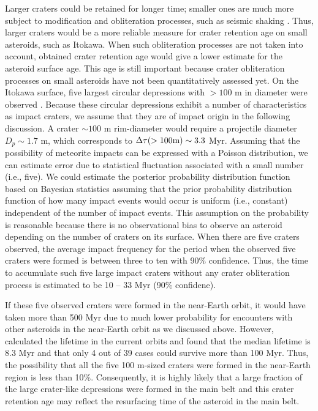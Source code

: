 \documentclass[3p,authoryear]{elsarticle}
\begin{document}
Larger craters could be retained for longer time; smaller ones are much more subject to modification and obliteration processes, such as seismic shaking \citep[i.e.,][]{michel2009}.
Thus, larger craters would be a more reliable measure for crater retention age on small asteroids, such as Itokawa.
When such obliteration processes are not taken into account, obtained crater retention age would give a lower estimate for the asteroid surface age.
This age is still important because crater obliteration processes on small asteroids have not been quantitatively assessed yet.
On the Itokawa surface, five largest circular depressions with $>100$ m in diameter were observed \citep{hirata2009}.
Because these circular depressions exhibit a number of characteristics as impact craters, we assume that they are of impact origin in the following discussion.
A crater $\sim 100$ m rim-diameter would require a projectile diameter $D_p\sim 1.7$ m, which corresponds to $\Delta \tau (>100 \rm{m})\sim 3.3$ Myr.
Assuming that the possibility of meteorite impacts can be expressed with a Poisson distribution, we can estimate error due to statistical fluctuation associated with a small number (i.e., five). We could estimate the posterior probability distribution function based on Bayesian statistics assuming that the prior probability distribution function of how many impact events would occur is uniform (i.e., constant) independent of the number of impact events.
This assumption on the probability is reasonable because there is no observational bias to observe an asteroid depending on the number of craters on its surface.
When there are five craters observed, the average impact frequency for the period when the observed five craters were formed is between three to ten with 90\% confidence.
Thus, the time to accumulate such five large impact craters without any crater obliteration process is estimated to be 10 -- 33 Myr (90\% confidene).

If these five observed craters were formed in the near-Earth orbit, it would have taken more than 500 Myr due to much lower probability for encounters with other asteroids in the near-Earth orbit as we discussed above.
However, \citet{michel2005} calculated the lifetime in the current orbits and found that the median lifetime is 8.3 Myr and that only 4 out of 39 cases could survive more than 100 Myr.
Thus, the possibility that all the five 100 m-sized craters were formed in the near-Earth region is less than 10\%.
Consequently, it is highly likely that a large fraction of the large crater-like depressions were formed in the main belt and this crater retention age may reflect the resurfacing time of the asteroid in the main belt.
\begin{comment}
This has an important implication for resurfacing on Itokawa in its near-Earth orbit.
Although many NEAs, such as Q-type asteroids, may experienced major resurfacing presumably due to tidal force upon close encounters to terrestrial planets ({binzel2010}), Itokawa probably did not experience such extensive resurfacing after it entered its near-Earth orbit.
Otherwise, its crater retention age would be much younger.
\end{comment}
\end{document}
